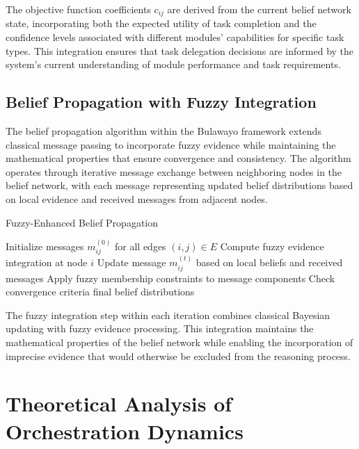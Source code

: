 \documentclass[12pt,a4paper]{article}
\begin{document}
The objective function coefficients $c_{ij}$ are derived from the current belief network state, incorporating both the expected utility of task completion and the confidence levels associated with different modules' capabilities for specific task types. This integration ensures that task delegation decisions are informed by the system's current understanding of module performance and task requirements.

\subsection{Belief Propagation with Fuzzy Integration}

The belief propagation algorithm within the Bulawayo framework extends classical message passing to incorporate fuzzy evidence while maintaining the mathematical properties that ensure convergence and consistency. The algorithm operates through iterative message exchange between neighboring nodes in the belief network, with each message representing updated belief distributions based on local evidence and received messages from adjacent nodes.

\begin{algorithm}
\caption{Fuzzy-Enhanced Belief Propagation}
\begin{algorithmic}
    \State Initialize messages $m_{ij}^{(0)}$ for all edges $(i,j) \in E$
                \State Compute fuzzy evidence integration at node $i$
                \State Update message $m_{ij}^{(t)}$ based on local beliefs and received messages
                \State Apply fuzzy membership constraints to message components
            \EndFor
        \EndFor
        \State Check convergence criteria
            \State \Return final belief distributions
        \EndIf
    \EndFor
\EndProcedure
\end{algorithmic}
\end{algorithm}

The fuzzy integration step within each iteration combines classical Bayesian updating with fuzzy evidence processing. This integration maintains the mathematical properties of the belief network while enabling the incorporation of imprecise evidence that would otherwise be excluded from the reasoning process.

\section{Theoretical Analysis of Orchestration Dynamics}
\end{document}
